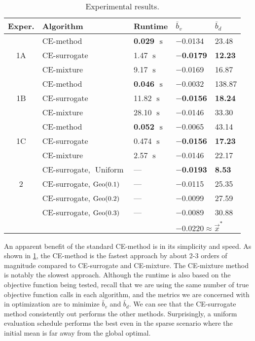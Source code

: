 \begin{table}[!ht]
    \centering
    \caption{\label{tab:results} Experimental results.}
    \begin{tabular}{cllll} %
    \toprule
    \textbf{Exper.} & \textbf{Algorithm} & \textbf{Runtime} & $\bar{b}_v$ & $\bar{b}_d$\\
    \midrule
    \multirow{3}{*}{1A} & CE-method & \textbf{0.029 $\operatorname{s}$} & $-$0.0134 & 23.48\\
    &CE-surrogate & 1.47 $\operatorname{s}$ & \textbf{\boldmath$-$0.0179} & \textbf{12.23}\\
    &CE-mixture & 9.17 $\operatorname{s}$ & $-$0.0169 & 16.87\\
    \midrule
    \multirow{3}{*}{1B} & CE-method & \textbf{0.046 $\operatorname{s}$} & $-$0.0032 & 138.87\\
    &CE-surrogate & 11.82 $\operatorname{s}$ & \textbf{\boldmath$-$0.0156} & \textbf{18.24}\\
    &CE-mixture & 28.10 $\operatorname{s}$ & $-$0.0146 & 33.30\\
    \midrule
    \multirow{3}{*}{1C} & CE-method & \textbf{0.052 $\operatorname{s}$} & $-$0.0065 & 43.14\\
    &CE-surrogate & 0.474 $\operatorname{s}$ & \textbf{\boldmath$-$0.0156} & \textbf{17.23}\\
    &CE-mixture & 2.57 $\operatorname{s}$ & $-$0.0146 & 22.17\\
    \midrule
    \multirow{3}{*}{2} & CE-surrogate, $\operatorname{Uniform}$ & --- & \textbf{\boldmath$-$0.0193} & \textbf{8.53}\\
    &CE-surrogate, $\operatorname{Geo}(0.1)$ & {\color{gray}---} & $-$0.0115 & 25.35\\
    &CE-surrogate, $\operatorname{Geo}(0.2)$ & {\color{gray}---} & $-$0.0099 & 27.59\\
    &CE-surrogate, $\operatorname{Geo}(0.3)$ & {\color{gray}---} & $-$0.0089 & 30.88\\
    \bottomrule
    & & & \multicolumn{2}{l}{$-\text{0.0220} \approx\vec{x}^*$}\\
    \end{tabular}
\end{table}

An apparent benefit of the standard CE-method is in its simplicity and speed.
As shown in \cref{tab:results}, the CE-method is the fastest approach by about 2-3 orders of magnitude compared to CE-surrogate and CE-mixture.
The CE-mixture method is notably the slowest approach.
Although the runtime is also based on the objective function being tested, recall that we are using the same number of true objective function calls in each algorithm, and the metrics we are concerned with in optimization are to minimize $\bar{b}_v$ and $\bar{b}_d$.
We can see that the CE-surrogate method consistently out performs the other methods.
Surprisingly, a uniform evaluation schedule performs the best even in the sparse scenario where the initial mean is far away from the global optimal.

